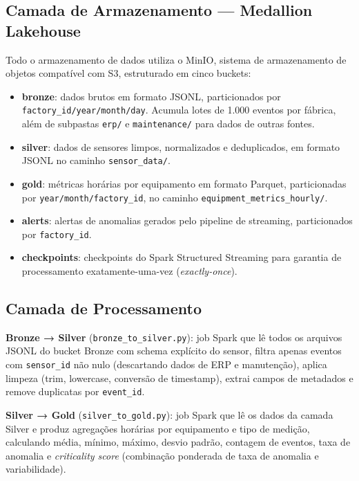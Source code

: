 \subsection{Camada de Armazenamento — Medallion Lakehouse}

Todo o armazenamento de dados utiliza o MinIO, sistema de armazenamento de objetos
compatível com S3, estruturado em cinco buckets:

\begin{itemize}
    \item \textbf{bronze}: dados brutos em formato JSONL, particionados por
    \texttt{factory\_id/year/month/day}. Acumula lotes de 1.000 eventos por fábrica,
    além de subpastas \texttt{erp/} e \texttt{maintenance/} para dados de outras fontes.

    \item \textbf{silver}: dados de sensores limpos, normalizados e deduplicados,
    em formato JSONL no caminho \texttt{sensor\_data/}.

    \item \textbf{gold}: métricas horárias por equipamento em formato Parquet,
    particionadas por \texttt{year/month/factory\_id}, no caminho
    \texttt{equipment\_metrics\_hourly/}.

    \item \textbf{alerts}: alertas de anomalias gerados pelo pipeline de streaming,
    particionados por \texttt{factory\_id}.

    \item \textbf{checkpoints}: checkpoints do Spark Structured Streaming para
    garantia de processamento exatamente-uma-vez (\textit{exactly-once}).
\end{itemize}

\subsection{Camada de Processamento}

\textbf{Bronze → Silver} (\texttt{bronze\_to\_silver.py}): job Spark que lê todos os
arquivos JSONL do bucket Bronze com schema explícito do sensor, filtra apenas eventos
com \texttt{sensor\_id} não nulo (descartando dados de ERP e manutenção), aplica
limpeza (trim, lowercase, conversão de timestamp), extrai campos de metadados e
remove duplicatas por \texttt{event\_id}.

\textbf{Silver → Gold} (\texttt{silver\_to\_gold.py}): job Spark que lê os dados da
camada Silver e produz agregações horárias por equipamento e tipo de medição, calculando
média, mínimo, máximo, desvio padrão, contagem de eventos, taxa de anomalia e
\textit{criticality score} (combinação ponderada de taxa de anomalia e variabilidade).

